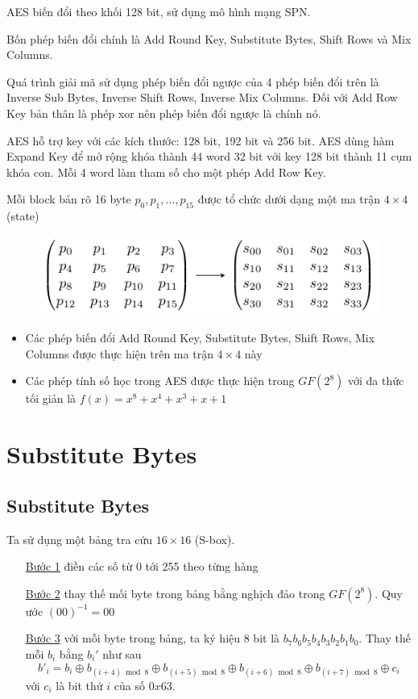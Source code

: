 \documentclass[a5paper]{article}
\begin{document}
    AES biến đổi theo khối 128 bit, sử dụng mô hình mạng SPN.

    Bốn phép biến đổi chính là Add Round Key, Substitute Bytes, Shift Rows và Mix Columns.

    Quá trình giải mã sử dụng phép biến đổi ngược của 4 phép biến đổi trên là Inverse Sub Bytes, Inverse Shift Rows, Inverse Mix Columns. Đối với Add Row Key bản thân là phép xor nên phép biến đổi ngược là chính nó.

    AES hỗ trợ key với các kích thước: 128 bit, 192 bit và 256 bit. AES dùng hàm Expand Key để mở rộng khóa thành 44 word 32 bit với key 128 bit thành 11 cụm khóa con. Mỗi 4 word làm tham số cho một phép Add Row Key.
    
    Mỗi block bản rõ 16 byte $p_0, p_1, \ldots, p_{15}$ được tổ chức dưới dạng một ma trận $4 \times 4$ (state)

    \begin{figure}[ht]
        \centering
        \includegraphics{aes.pdf}
    \end{figure}    

    \begin{itemize}
        \item Các phép biến đổi Add Round Key, Substitute Bytes, Shift Rows, Mix Columns được thực hiện trên ma trận $4 \times 4$ này
        \item Các phép tính số học trong AES được thực hiện trong $GF(2^8)$ với đa thức tối giản là $f(x) = x^8 + x^4 + x^3 + x + 1$
    \end{itemize}

    \section{Substitute Bytes}

    \subsection{Substitute Bytes}

    Ta sử dụng một bảng tra cứu $16 \times 16$ (S-box).

    \begin{itemize}
        \item [\underline{Bước 1}] điền các số từ 0 tới 255 theo từng hàng
        \item [\underline{Bước 2}] thay thế mối byte trong bảng bằng nghịch đảo trong $GF(2^8)$. Quy ước $(00)^{-1} = 00$
        \item [\underline{Bước 3}] với mỗi byte trong bảng, ta ký hiệu 8 bit là $b_7 b_6 b_5 b_4 b_3 b_2 b_1 b_0$. Thay thế mỗi $b_i$ bằng $b_i'$ như sau
        \[ b'_i = b_i \oplus b_{(i+4) \bmod 8} \oplus b_{(i+5) \bmod 8} \oplus b_{(i+6) \bmod 8} \oplus b_{(i+7) \bmod 8} \oplus c_i \]
        với $c_i$ là bit thứ $i$ của số $0x63$.
    \end{itemize}
\end{document}
